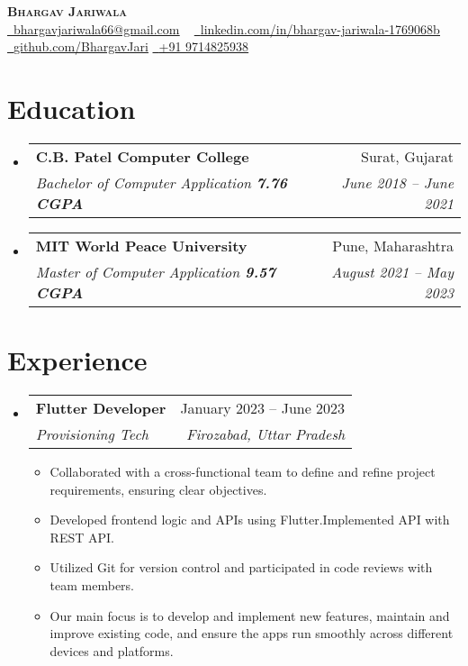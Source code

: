 \documentclass[letterpaper,11pt]{article}
\makeatletter
\newcommand{\resumeItem}[1]{
  \item\small{
    {#1 \vspace{-4pt}}
  }
}
\newcommand{\resumeSubheading}[4]{
  \vspace{-2pt}\item
    \begin{tabular*}{0.97\textwidth}[t]{l@{\extracolsep{\fill}}r}
      \textbf{#1} & #2 \\
      \textit{\small#3} & \textit{\small #4} \\
    \end{tabular*}\vspace{-7pt}
}
\newcommand{\resumeSubHeadingListStart}{\begin{itemize}[leftmargin=0.05in, label={}]}
\newcommand{\resumeSubHeadingListEnd}{\end{itemize}}
\newcommand{\resumeItemListStart}{\begin{itemize}\vspace{2pt}}
\newcommand{\resumeItemListEnd}{\end{itemize}\vspace{-5pt}}
\makeatother
\begin{document}

\begin{center}
    \textbf{\Huge \scshape Bhargav Jariwala} \\ \vspace{1pt}
    \href{mailto:x@gmail.com}{\raisebox{-0.2\height}\faEnvelope\  \underline{bhargavjariwala66@gmail.com}} ~ 
    \href{https://linkedin.com/in//}{\raisebox{-0.2\height}\faLinkedin\ \underline{linkedin.com/in/bhargav-jariwala-1769068b}}  ~
    \href{https://github.com/}{\raisebox{-0.2\height}\faGithub\ \underline{github.com/BhargavJari}}
    \href{tel:9714825938}{\raisebox{-0.2\height}\faPhone\ \underline{+91 9714825938}}
    \vspace{-8pt}
\end{center}


\section{Education}
  \resumeSubHeadingListStart
    \resumeSubheading
       {C.B. Patel Computer College}{Surat, Gujarat}
      {Bachelor of Computer Application  \textbf{7.76 CGPA}}{June 2018 -- June 2021}
    \resumeSubheading
       {MIT World Peace University}{Pune, Maharashtra}
      {Master of Computer Application  \textbf{9.57 CGPA}}{August 2021 -- May 2023}
  \resumeSubHeadingListEnd


\section{Experience}
  \resumeSubHeadingListStart

    \resumeSubheading
      {Flutter Developer}{January 2023 -- June 2023}
      {Provisioning Tech}{Firozabad, Uttar Pradesh}
      \resumeItemListStart
        \resumeItem{Collaborated with a cross-functional team to define and refine project requirements, ensuring clear objectives.}
        \resumeItem{Developed frontend logic and APIs using Flutter.Implemented API with REST API.}
        \resumeItem{ Utilized Git for version control and participated in code reviews with team members.}
         \resumeItem{Our main focus is to develop and implement 
        new features, maintain and improve existing code, and ensure the apps run smoothly across different devices and platforms.}
      \resumeItemListEnd
    \resumeSubHeadingListEnd
\end{document}
